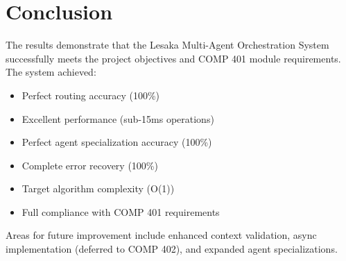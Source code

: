 \section{Conclusion}

The results demonstrate that the Lesaka Multi-Agent Orchestration System successfully meets the project objectives and COMP 401 module requirements. The system achieved:

\begin{itemize}
    \item Perfect routing accuracy (100\%)
    \item Excellent performance (sub-15ms operations)
    \item Perfect agent specialization accuracy (100\%)
    \item Complete error recovery (100\%)
    \item Target algorithm complexity (O(1))
    \item Full compliance with COMP 401 requirements
\end{itemize}

Areas for future improvement include enhanced context validation, async implementation (deferred to COMP 402), and expanded agent specializations.
